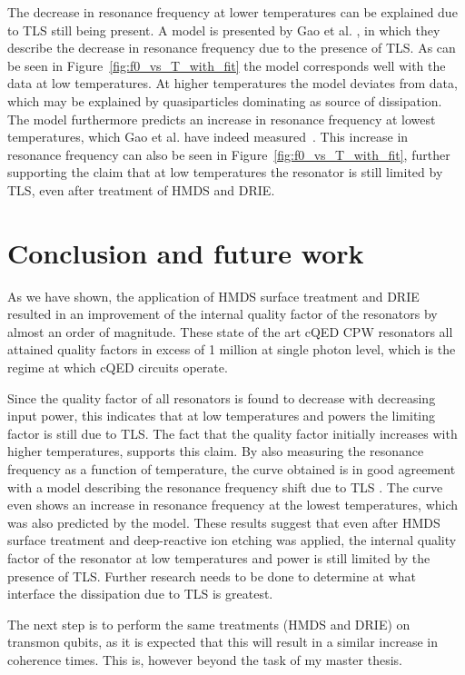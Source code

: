 The decrease in resonance frequency at lower temperatures can be explained due to TLS still being present. A model is presented by Gao et al. \cite{gao2008experimental}, in which they describe the decrease in resonance frequency due to the presence of TLS. As can be seen in Figure~\ref{fig:f0_vs_T_with_fit} the model corresponds well with the data at low temperatures. At higher temperatures the model deviates from data, which may be explained by quasiparticles dominating as source of dissipation. The model furthermore predicts an increase in resonance frequency at lowest temperatures, which Gao et al. have indeed measured~\cite{gao2008experimental}. This increase in resonance frequency can also be seen in Figure~\ref{fig:f0_vs_T_with_fit}, further supporting the claim that at low temperatures the resonator is still limited by TLS, even after treatment of HMDS and DRIE.



\chapter{Conclusion and future work}

As we have shown, the application of HMDS surface treatment and DRIE resulted in an improvement of the internal quality factor of the resonators by almost an order of magnitude. These state of the art cQED CPW resonators all attained quality factors in excess of 1 million at single photon level, which is the regime at which cQED circuits operate.

Since the quality factor of all resonators is found to decrease with decreasing input power, this indicates that at low temperatures and powers the limiting factor is still due to TLS. The fact that the quality factor initially increases with higher temperatures, supports this claim. By also measuring  the resonance frequency as a function of temperature, the curve obtained is in good agreement with a model describing the resonance frequency shift due to TLS \cite{gao2008experimental}. The curve even shows an increase in resonance frequency at the lowest temperatures, which was also predicted by the model. These results suggest that even after HMDS surface treatment and deep-reactive ion etching was applied, the internal quality factor of the resonator at low temperatures and power is still limited by the presence of TLS. Further research needs to be done to determine at what interface the dissipation due to TLS is greatest.

The next step is to perform the same treatments (HMDS and DRIE) on transmon qubits, as it is expected that this will result in a similar increase in coherence times. This is, however beyond the task of my master thesis.
